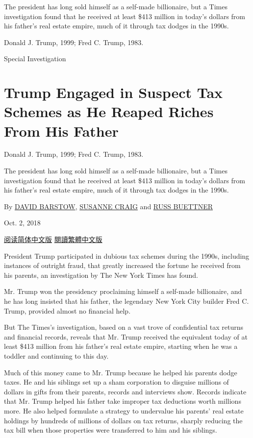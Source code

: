 The president has long sold himself as a self-made billionaire, but a
Times investigation found that he received at least \$413 million in
today's dollars from his father's real estate empire, much of it through
tax dodges in the 1990s.

Donald J. Trump, 1999; Fred C. Trump, 1983.

Special Investigation

\hypertarget{trump-engaged-in-suspect-tax-schemes-as-he-reaped-riches-from-his-father-1}{%
\section{Trump Engaged in Suspect Tax Schemes as He Reaped Riches From
His
Father}\label{trump-engaged-in-suspect-tax-schemes-as-he-reaped-riches-from-his-father-1}}

Donald J. Trump, 1999; Fred C. Trump, 1983.

The president has long sold himself as a self-made billionaire, but a
Times investigation found that he received at least \$413 million in
today's dollars from his father's real estate empire, much of it through
tax dodges in the 1990s.

By \href{https://www.nytimes.com/by/david-barstow}{DAVID BARSTOW},
\href{https://www.nytimes.com/by/susanne-craig}{SUSANNE CRAIG} and
\href{https://www.nytimes.com/by/russ-buettner}{RUSS BUETTNER}

Oct. 2, 2018

\href{https://cn.nytimes.com/usa/20181008/tax-report/}{阅读简体中文版}
\href{https://cn.nytimes.com/usa/20181008/tax-report/zh-hant/}{閱讀繁體中文版}

President Trump participated in dubious tax schemes during the 1990s,
including instances of outright fraud, that greatly increased the
fortune he received from his parents, an investigation by The New York
Times has found.

Mr. Trump won the presidency proclaiming himself a self-made
billionaire, and he has long insisted that his father, the legendary New
York City builder Fred C. Trump, provided almost no financial help.

But The Times's investigation, based on a vast trove of confidential tax
returns and financial records, reveals that Mr. Trump received the
equivalent today of at least \$413 million from his father's real estate
empire, starting when he was a toddler and continuing to this day.

Much of this money came to Mr. Trump because he helped his parents dodge
taxes. He and his siblings set up a sham corporation to disguise
millions of dollars in gifts from their parents, records and interviews
show. Records indicate that Mr. Trump helped his father take improper
tax deductions worth millions more. He also helped formulate a strategy
to undervalue his parents' real estate holdings by hundreds of millions
of dollars on tax returns, sharply reducing the tax bill when those
properties were transferred to him and his siblings.

